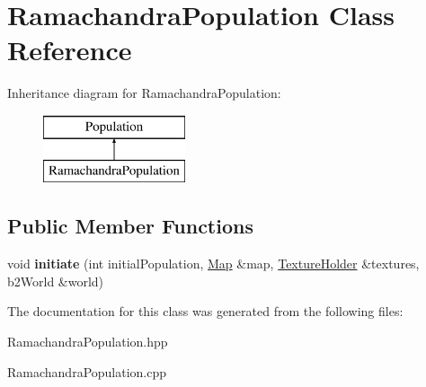 \hypertarget{class_ramachandra_population}{\section{Ramachandra\-Population Class Reference}
\label{class_ramachandra_population}
}
Inheritance diagram for Ramachandra\-Population\-:\begin{figure}[H]
\begin{center}
\leavevmode
\includegraphics[height=2.000000cm]{class_ramachandra_population}
\end{center}
\end{figure}
\subsection*{Public Member Functions}
\begin{DoxyCompactItemize}
\item 
\hypertarget{class_ramachandra_population_a62dd339d535b148ca6dde79c757a6660}{void {\bfseries initiate} (int initial\-Population, \hyperlink{class_map}{Map} \&map, \hyperlink{class_texture_holder}{Texture\-Holder} \&textures, b2\-World \&world)}\label{class_ramachandra_population_a62dd339d535b148ca6dde79c757a6660}

\end{DoxyCompactItemize}


The documentation for this class was generated from the following files\-:\begin{DoxyCompactItemize}
\item 
Ramachandra\-Population.\-hpp\item 
Ramachandra\-Population.\-cpp\end{DoxyCompactItemize}
